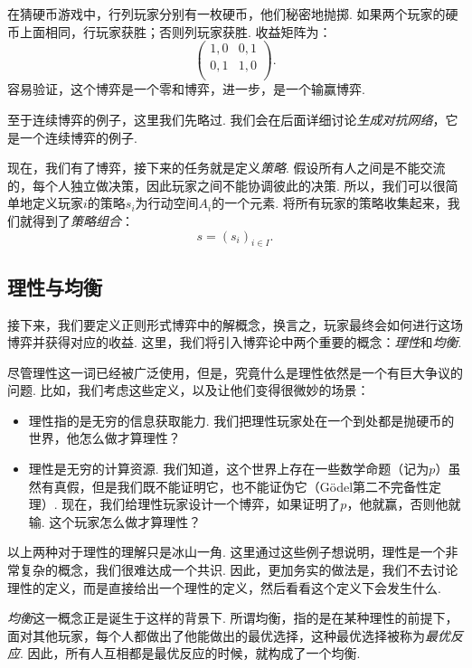 \begin{example}[猜硬币游戏]\label{ex:matching-pennies}
在猜硬币游戏中，行列玩家分别有一枚硬币，他们秘密地抛掷. 如果两个玩家的硬币上面相同，行玩家获胜；否则列玩家获胜. 收益矩阵为：
    \[
    \begin{pmatrix}
    1,0&0,1\\
    0,1&1,0\\
    \end{pmatrix}.
    \]
容易验证，这个博弈是一个零和博弈，进一步，是一个输赢博弈.
\end{example}

至于连续博弈的例子，这里我们先略过. 我们会在后面详细讨论\textit{生成对抗网络}，它是一个连续博弈的例子.

现在，我们有了博弈，接下来的任务就是定义\textit{策略}. 假设所有人之间是不能交流的，每个人独立做决策，因此玩家之间不能协调彼此的决策. 所以，我们可以很简单地定义玩家$i$的策略$s_i$为行动空间$A_i$的一个元素. 将所有玩家的策略收集起来，我们就得到了\textit{策略组合}：
\[
s=(s_i)_{i\in I}.
\]

\subsection{理性与均衡}

接下来，我们要定义正则形式博弈中的解概念，换言之，玩家最终会如何进行这场博弈并获得对应的收益. 这里，我们将引入博弈论中两个重要的概念：\textit{理性}和\textit{均衡}. 

尽管理性这一词已经被广泛使用，但是，究竟什么是理性依然是一个有巨大争议的问题. 比如，我们考虑这些定义，以及让他们变得很微妙的场景：
\begin{itemize}
    \item 理性指的是无穷的信息获取能力. 我们把理性玩家处在一个到处都是抛硬币的世界，他怎么做才算理性？
    \item 理性是无穷的计算资源. 我们知道，这个世界上存在一些数学命题（记为$p$）虽然有真假，但是我们既不能证明它，也不能证伪它（Gödel第二不完备性定理）. 现在，我们给理性玩家设计一个博弈，如果证明了$p$，他就赢，否则他就输. 这个玩家怎么做才算理性？
\end{itemize}

以上两种对于理性的理解只是冰山一角. 这里通过这些例子想说明，理性是一个非常复杂的概念，我们很难达成一个共识. 因此，更加务实的做法是，我们不去讨论理性的定义，而是直接给出一个理性的定义，然后看看这个定义下会发生什么.

\textit{均衡}这一概念正是诞生于这样的背景下. 所谓均衡，指的是在某种理性的前提下，面对其他玩家，每个人都做出了他能做出的最优选择，这种最优选择被称为\textit{最优反应}. 因此，所有人互相都是最优反应的时候，就构成了一个均衡.


